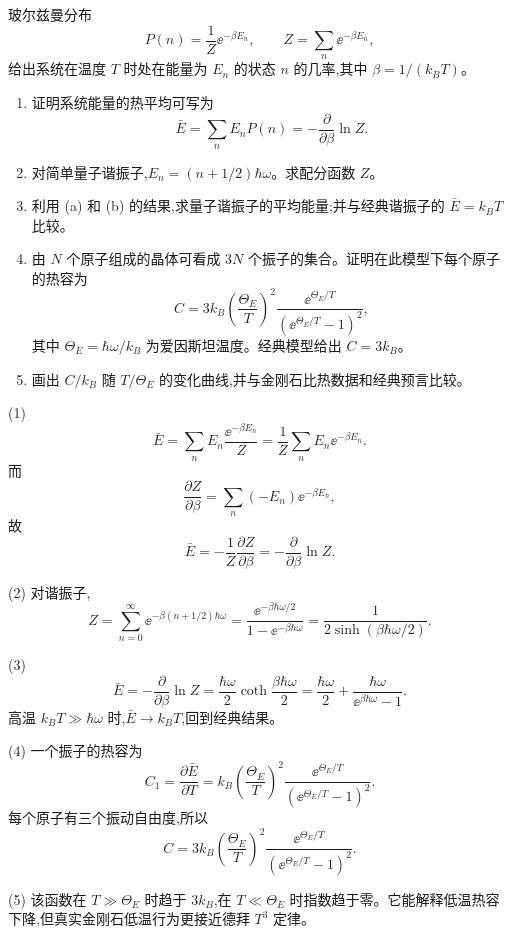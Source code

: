 \begin{question}
玻尔兹曼分布
\[
P(n)=\frac{1}{Z}\ee^{-\beta E_n},\qquad Z=\sum_n \ee^{-\beta E_n},
\]
给出系统在温度 $T$ 时处在能量为 $E_n$ 的状态 $n$ 的几率,其中 $\beta=1/(k_BT)$。
\begin{enumerate}
\item 证明系统能量的热平均可写为
\[
\bar E=\sum_n E_nP(n)=-\frac{\partial}{\partial\beta}\ln Z .
\]
\item 对简单量子谐振子,$E_n=(n+1/2)\hbar\omega$。求配分函数 $Z$。
\item 利用 (a) 和 (b) 的结果,求量子谐振子的平均能量;并与经典谐振子的 $\bar E=k_BT$ 比较。
\item 由 $N$ 个原子组成的晶体可看成 $3N$ 个振子的集合。证明在此模型下每个原子的热容为
\[
C=3k_B\left(\frac{\Theta_E}{T}\right)^2\frac{\ee^{\Theta_E/T}}{(\ee^{\Theta_E/T}-1)^2},
\]
其中 $\Theta_E=\hbar\omega/k_B$ 为爱因斯坦温度。经典模型给出 $C=3k_B$。
\item 画出 $C/k_B$ 随 $T/\Theta_E$ 的变化曲线,并与金刚石比热数据和经典预言比较。
\end{enumerate}
\begin{solution}
(1) 
\[
\bar E=\sum_nE_n\frac{\ee^{-\beta E_n}}{Z}
=\frac1Z\sum_nE_n\ee^{-\beta E_n}.
\]
而
\[
\frac{\partial Z}{\partial\beta}=\sum_n(-E_n)\ee^{-\beta E_n},
\]
故
\[
\bar E=-\frac1Z\frac{\partial Z}{\partial\beta}
=-\frac{\partial}{\partial\beta}\ln Z.
\]

(2) 对谐振子,
\[
Z=\sum_{n=0}^{\infty}\ee^{-\beta(n+1/2)\hbar\omega}
=\frac{\ee^{-\beta\hbar\omega/2}}{1-\ee^{-\beta\hbar\omega}}
=\frac1{2\sinh(\beta\hbar\omega/2)}.
\]

(3) 
\[
\bar E=-\frac{\partial}{\partial\beta}\ln Z
=\frac{\hbar\omega}{2}\coth\frac{\beta\hbar\omega}{2}
=\frac{\hbar\omega}{2}+\frac{\hbar\omega}{\ee^{\beta\hbar\omega}-1}.
\]
高温 $k_BT\gg\hbar\omega$ 时,$\bar E\to k_BT$,回到经典结果。

(4) 一个振子的热容为
\[
C_1=\frac{\partial\bar E}{\partial T}
=k_B\left(\frac{\Theta_E}{T}\right)^2
\frac{\ee^{\Theta_E/T}}{(\ee^{\Theta_E/T}-1)^2}.
\]
每个原子有三个振动自由度,所以
\[
C=3k_B\left(\frac{\Theta_E}{T}\right)^2
\frac{\ee^{\Theta_E/T}}{(\ee^{\Theta_E/T}-1)^2}.
\]

(5) 该函数在 $T\gg\Theta_E$ 时趋于 $3k_B$,在 $T\ll\Theta_E$ 时指数趋于零。它能解释低温热容下降,但真实金刚石低温行为更接近德拜 $T^3$ 定律。
\end{solution}
\end{question}


